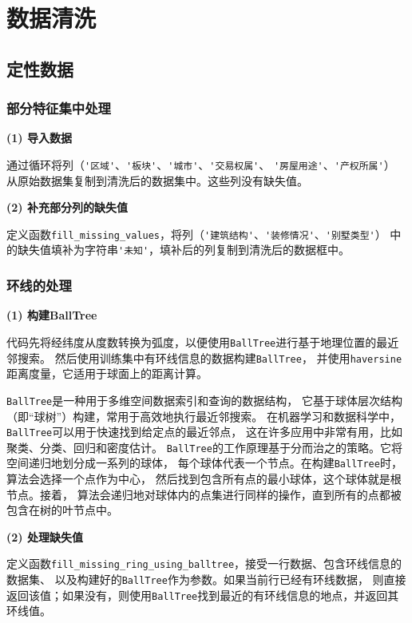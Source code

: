\documentclass[
    report,     %
    oneside,    %
    UTF8,       %
    zihao=-4    %
]{config} %
\begin{document}
\chapter{数据清洗}
\section{定性数据}
\subsection{部分特征集中处理}

\textbf{(1) 导入数据}

通过循环将列（\lstinline|'区域'|、\lstinline|'板块'|、\lstinline|'城市'|、\lstinline|'交易权属'|、
\lstinline|'房屋用途'|、\lstinline|'产权所属'|）
从原始数据集复制到清洗后的数据集中。这些列没有缺失值。

\textbf{(2) 补充部分列的缺失值}

定义函数\lstinline|fill_missing_values|，将列（\lstinline|'建筑结构'|、\lstinline|'装修情况'|、\lstinline|'别墅类型'|）
中的缺失值填补为字符串\lstinline|'未知'|，填补后的列复制到清洗后的数据框中。

\subsection{环线的处理}
\textbf{(1) 构建BallTree}

代码先将经纬度从度数转换为弧度，以便使用\lstinline|BallTree|进行基于地理位置的最近邻搜索。
然后使用训练集中有环线信息的数据构建\lstinline|BallTree|，
并使用\lstinline|haversine|距离度量，它适用于球面上的距离计算。

\lstinline|BallTree|是一种用于多维空间数据索引和查询的数据结构，
它基于球体层次结构（即“球树”）构建，常用于高效地执行最近邻搜索。
在机器学习和数据科学中，\lstinline|BallTree|可以用于快速找到给定点的最近邻点，
这在许多应用中非常有用，比如聚类、分类、回归和密度估计。
\lstinline|BallTree|的工作原理基于分而治之的策略。它将空间递归地划分成一系列的球体，
每个球体代表一个节点。在构建\lstinline|BallTree|时，算法会选择一个点作为中心，
然后找到包含所有点的最小球体，这个球体就是根节点。接着，
算法会递归地对球体内的点集进行同样的操作，直到所有的点都被包含在树的叶节点中。

\textbf{(2) 处理缺失值}

定义函数\lstinline|fill_missing_ring_using_balltree|，接受一行数据、包含环线信息的数据集、
以及构建好的\lstinline|BallTree|作为参数。如果当前行已经有环线数据，
则直接返回该值；如果没有，则使用\lstinline|BallTree|找到最近的有环线信息的地点，并返回其环线值。
\end{document}
